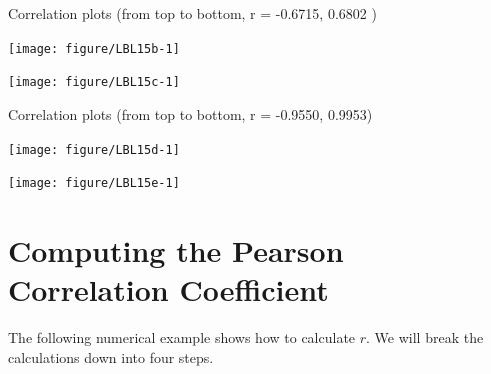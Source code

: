 \documentclass[11pt, chapterprefix=true]{scrbook}\usepackage[]{graphicx}\usepackage[]{color}
\begin{document}
\begin{minipage}[ht]{7.1cm}

Correlation plots (from top to bottom, r = -0.6715, 0.6802 )




{\centering \texttt{[image: figure/LBL15b-1]} 

}





{\centering \texttt{[image: figure/LBL15c-1]} 

}




\end{minipage} \hfill
\begin{minipage}[ht]{7.1cm}


Correlation plots (from top to bottom, r = -0.9550, 0.9953)




{\centering \texttt{[image: figure/LBL15d-1]} 

}





{\centering \texttt{[image: figure/LBL15e-1]} 

}



\end{minipage}

\section{Computing the Pearson Correlation Coefficient}

The following numerical example shows how to calculate $r$.  We will break the calculations down into four steps.
\end{document}
